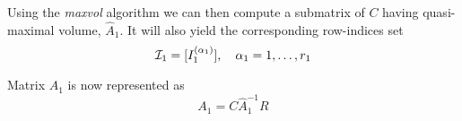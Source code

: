 Using the \emph{maxvol} algorithm we can then compute a submatrix of $C$ having quasi-maximal volume, $\hat{A}_1$. It will also yield the corresponding row-indices set
\begin{equation*}
  \mathcal{I}_1 = [I_1^{(\alpha_1)}], \quad \alpha_1 = 1,\ldots,r_1
\end{equation*}

Matrix $A_1$ is now represented as
\begin{equation*}
  A_1 = C\hat{A}_1^{-1}R
\end{equation*}

